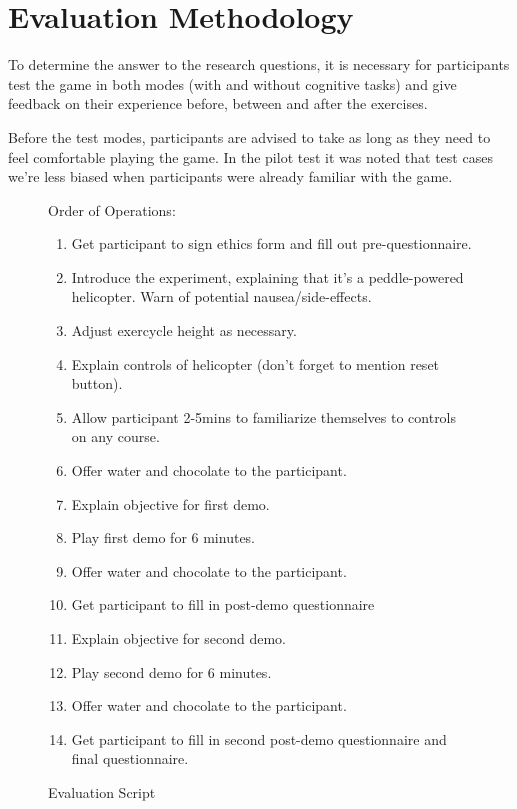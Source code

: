 \documentclass[a4paper, 11pt]{article}
\begin{document}
\clearpage

\section{Evaluation Methodology}

\begin{multicols}{2}

To determine the answer to the research questions, it is necessary for participants test the game in both modes (with and without cognitive tasks) and give feedback on their experience before, between and after the exercises.

Before the test modes, participants are advised to take as long as they need to feel comfortable playing the game. In the pilot test it was noted that test cases we're less biased when participants were already familiar with the game.

\end{multicols}

\begin{figure}[H]
\centering

Order of Operations:

\begin{enumerate}
	\item Get participant to sign ethics form and fill out pre-questionnaire.
	\item Introduce the experiment, explaining that it’s a peddle-powered helicopter. Warn of potential nausea/side-effects.
	\item Adjust exercycle height as necessary.
	\item Explain controls of helicopter (don’t forget to mention reset button).
	\item Allow participant 2-5mins to familiarize themselves to controls on any course.
	\item Offer water and chocolate to the participant.
	\item Explain objective for first demo.
	\item Play first demo for 6 minutes.
	\item Offer water and chocolate to the participant.
	\item Get participant to fill in post-demo questionnaire
	\item Explain objective for second demo.
	\item Play second demo for 6 minutes.
	\item Offer water and chocolate to the participant.
	\item Get participant to fill in second post-demo questionnaire and final questionnaire.
\end{enumerate}
\caption{Evaluation Script}
\end{figure}
\end{document}
